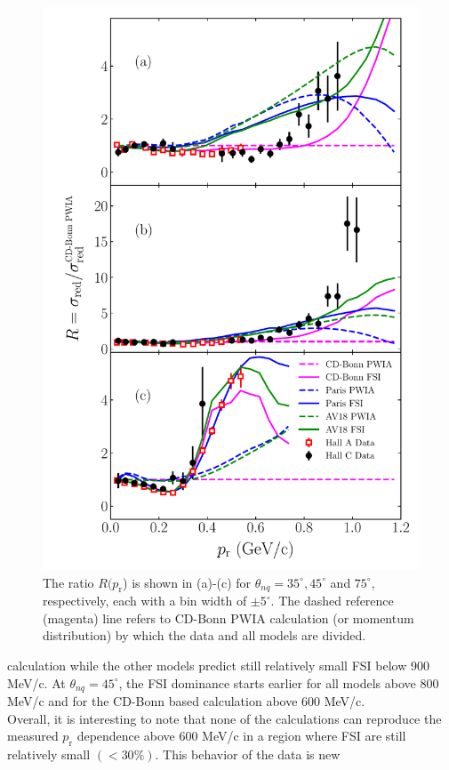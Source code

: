 \begin{figure}[!t]
\includegraphics[scale=0.5]{./prl_plots/PRL_plot2.pdf}
\caption{The ratio $R(p_{\mathrm{r}}$) is shown in (a)-(c) for $\theta_{nq}=35^{\circ}, 45^{\circ}$ and $75^{\circ}$, respectively, each with a bin width of $\pm 5^{\circ}$.
The dashed reference (magenta) line refers to CD-Bonn PWIA calculation (or momentum distribution) by which the data and all models are divided.}
\label{fig:fig2}
\end{figure}
calculation while the other models predict still relatively small FSI below 900 MeV/c.
At $\theta_{nq}=45^{\circ}$, the FSI dominance starts earlier for all models above 800 MeV/c and for the CD-Bonn based calculation above 600 MeV/c. \\
\indent Overall, it is interesting to note that none of the calculations can reproduce the measured $p_{\mathrm{r}}$ dependence above 600 MeV/c in a region where FSI are still relatively small $(<30\%)$.  This behavior of the data is new
